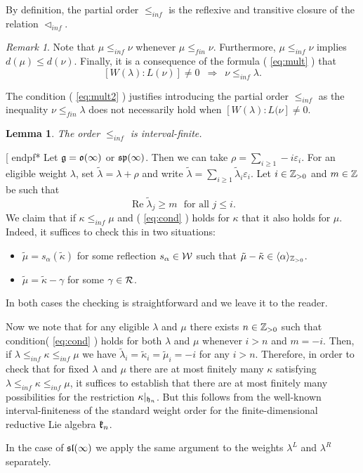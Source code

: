 \documentclass[12pt]{amsart}
\makeatletter
\def\mathbb{\Bbb}
\def\mathfrak{\frak}
\newenvironment{proof}{%
         \@ifnextchar[{%
                       \expandafter\let\expandafter\end@proof
                         \csname endpf*\endcsname
                         \my@proof
                      }{\let\end@proof\endpf\pf}%
        }{\end@proof}
\def\my@proof[#1]{\@nameuse{pf*}{#1}}
\def\mathcal{\cal}
\def\@putname#1#2#3#4{\def\@@ref{#3}\let\old@bf\bf
        \def\bf##1{\old@bf\if?\noexpand##1?{#4}\else##1\fi}%
        #1{#2}%
        \let\bf\old@bf}
\def\@putname#1#2#3#4{\def\@@ref{#3}\let\old@bf\bf    %
        \let\old@reset@font\reset@font                  %
        \def\bf##1{\old@bf\if?\noexpand##1?{#4}\else##1\fi}%
        \def\reset@font##1##2{\old@reset@font##1\if?\noexpand##2?{#4}\else##2\fi}#1{#2}%
        \let\bf\old@bf\let\reset@font\old@reset@font}
\let\my@ref=\ref
\def\ref#1{\@putname\my@ref{#1}{#1}{\tiny\rm\@@ref}}
\theoremstyle{plain} %
\numberwithin{equation}{section}
\theoremstyle{definition}
\theoremstyle{remark}
\newtheorem{remark}[definition]{Remark} %
\theoremstyle{plain} %
\newtheorem{lemma}[definition]{Lemma}
\newcommand{\fg}{\mathfrak{g}}
\newcommand{\fk}{\mathfrak{k}}
\newcommand{\fh}{\mathfrak{h}}
\makeatother
\begin{document}
  By definition, the partial order $\leq_{inf}$ is the reflexive and transitive closure of the relation $\lhd_{inf}$.
 \begin{remark}
   Note that $\mu\leq_{inf}\nu$ whenever $\mu\leq_{fin}\nu$. Furthermore, $\mu\leq_{inf}\nu$ implies $d(\mu)\leq d(\nu)$.
   Finally, it is a consequence of the formula (\ref{eq:mult}) that
  \begin{equation}\label{eq:mult2}
    [W(\lambda):L(\nu)]\neq 0\,\,\,\Rightarrow\,\,\,\nu\leq_{inf}\lambda. 
  \end{equation}
  \end{remark}
   The condition (\ref{eq:mult2}) justifies introducing the partial order $\leq_{inf}$ as the inequality $\nu\leq_{fin}\lambda$ does not necessarily hold when $[W(\lambda):L(\nu]\neq 0$.  
  \begin{lemma}\label{locfin} The order $\leq_{inf}$ is interval-finite. 
  \end{lemma}
  \begin{proof} Let $\fg=\mathfrak{o}(\infty)$ or $\mathfrak{sp}(\infty)$. Then we can take
    $\rho=\sum_{i\geq 1}-i\varepsilon_i$. For an eligible weight $\lambda$, set $\tilde\lambda=\lambda+\rho$ and write
    $\tilde\lambda=\sum_{i\geq 1}\tilde\lambda_i\varepsilon_i$. Let $i\in\mathbb Z_{>0}$ and $m\in\mathbb Z$ be such that
    \begin{equation}\label{eq:cond} \operatorname{Re}\tilde\lambda_j\geq m\,\,\text{ for all}\,\, j\leq i.
      \end{equation}
      We claim that if $\kappa\leq_{inf}\mu$ and (\ref{eq:cond}) holds for $\kappa$ that it also holds for $\mu$. Indeed, it suffices to check this in
      two situations:
     \begin{itemize}
     \item $\tilde\mu=s_\alpha(\tilde\kappa)$ for some reflection $s_{\alpha}\in\mathcal W$ such that $\tilde\mu-\tilde\kappa\in\langle\alpha\rangle_{\mathbb Z_{>0}}$.
       \item $\tilde\mu=\tilde\kappa-\gamma$ for some $\gamma\in\mathcal R$.
       \end{itemize}
       In both cases the checking is straightforward and we leave it to the reader.

       Now we note that for any eligible $\lambda$ and $\mu$ there exists $n\in \mathbb Z_{>0}$ such that condition(\ref{eq:cond}) holds for  both $\lambda$ and $\mu$ whenever $i> n$
        and  $m=-i$.
       Then, if $\lambda\leq_{inf}\kappa\leq_{inf}\mu$ we have $\tilde\lambda_i=\tilde\kappa_i=\tilde\mu_i=-i$ for any $i> n$. 
Therefore, in order to check that for fixed $\lambda$ and $\mu$ there are at most finitely many $\kappa$ satisfying  $\lambda\leq_{inf}\kappa\leq_{inf}\mu$, it suffices to establish that there are at most finitely many possibilities for the restriction 
       $\kappa|_{\fh_n}$. But this follows from the well-known interval-finiteness of the standard weight order for the finite-dimensional reductive Lie algebra $\fk_n$.
       
In  the case of $\mathfrak{sl}(\infty)$ we apply the same argument to the weights  $\lambda^L$ and $\lambda^R$ separately. 
    \end{proof}
\end{document}
